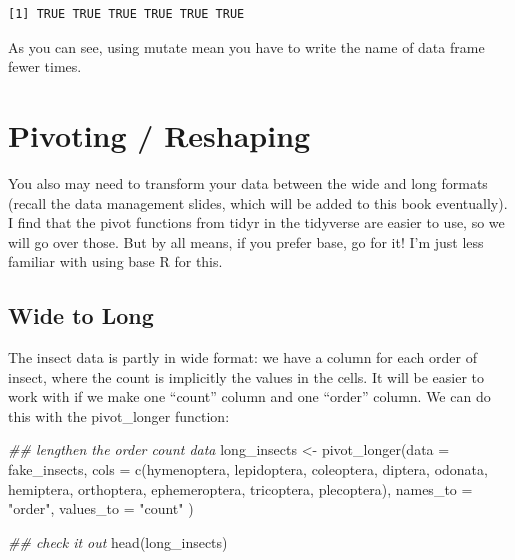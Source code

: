 \documentclass[
  letterpaper,
  DIV=11,
  numbers=noendperiod]{scrreprt}
\newenvironment{Shaded}{\begin{snugshade}}{\end{snugshade}}
\newcommand{\AttributeTok}[1]{\textcolor[rgb]{0.40,0.45,0.13}{#1}}
\newcommand{\DocumentationTok}[1]{\textcolor[rgb]{0.37,0.37,0.37}{\textit{#1}}}
\newcommand{\FunctionTok}[1]{\textcolor[rgb]{0.28,0.35,0.67}{#1}}
\newcommand{\NormalTok}[1]{\textcolor[rgb]{0.00,0.23,0.31}{#1}}
\newcommand{\OtherTok}[1]{\textcolor[rgb]{0.00,0.23,0.31}{#1}}
\newcommand{\StringTok}[1]{\textcolor[rgb]{0.13,0.47,0.30}{#1}}
\begin{document}
\begin{verbatim}
[1] TRUE TRUE TRUE TRUE TRUE TRUE
\end{verbatim}

As you can see, using mutate mean you have to write the name of data
frame fewer times.

\section{Pivoting / Reshaping}\label{pivoting-reshaping}

You also may need to transform your data between the wide and long
formats (recall the data management slides, which will be added to this
book eventually). I find that the pivot functions from tidyr in the
tidyverse are easier to use, so we will go over those. But by all means,
if you prefer base, go for it! I'm just less familiar with using base R
for this.

\subsection{Wide to Long}\label{wide-to-long}

The insect data is partly in wide format: we have a column for each
order of insect, where the count is implicitly the values in the cells.
It will be easier to work with if we make one ``count'' column and one
``order'' column. We can do this with the pivot\_longer function:

\begin{Shaded}
\begin{Highlighting}[]
\DocumentationTok{\#\# lengthen the order count data}
\NormalTok{long\_insects }\OtherTok{\textless{}{-}} \FunctionTok{pivot\_longer}\NormalTok{(}\AttributeTok{data =}\NormalTok{ fake\_insects, }
                             \AttributeTok{cols =} \FunctionTok{c}\NormalTok{(hymenoptera, lepidoptera, coleoptera, diptera, }
\NormalTok{                                      odonata, hemiptera, orthoptera, ephemeroptera, }
\NormalTok{                                      tricoptera, plecoptera),}
                             \AttributeTok{names\_to =} \StringTok{"order"}\NormalTok{,}
                             \AttributeTok{values\_to =} \StringTok{"count"}
\NormalTok{                             )}

\DocumentationTok{\#\# check it out}
\FunctionTok{head}\NormalTok{(long\_insects)}
\end{Highlighting}
\end{Shaded}
\end{document}
